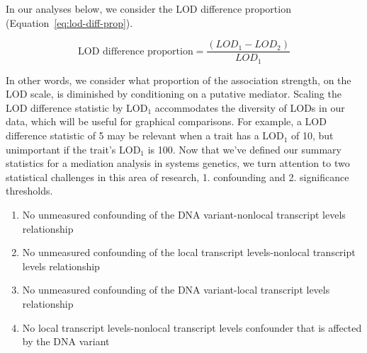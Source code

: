 \documentclass[oneside]{book}\usepackage[]{graphicx}\usepackage[]{color}
\newenvironment{frameenv}[1]
    {\begin{myfloat}[tb]
    \begin{mdframed}[roundcorner=10pt,backgroundcolor=blue!10]
    \caption{#1}
    }
    {%
    \end{mdframed}\end{myfloat}
    }
\begin{document}
In our analyses below, we consider the LOD difference 
proportion (Equation~\ref{eq:lod-diff-prop}).

\begin{equation}
\text{LOD difference proportion} = \frac{(LOD_1 - LOD_2)}{LOD_1}
\label{eq:lod-diff-prop}
\end{equation}

In other words, we consider what proportion of the association strength, on the LOD scale, is diminished by conditioning on a putative mediator. 
Scaling the LOD difference statistic by LOD$_1$ accommodates the diversity of LODs in our data, which will be useful for graphical comparisons. 
For example, a LOD difference statistic of 5 may be relevant when 
a trait has a LOD$_1$ of 10, but unimportant if the trait's LOD$_1$ is 100. Now that we've defined our summary statistics for a mediation analysis in systems genetics, we turn attention to two statistical challenges in this area of research, 1. confounding and 2. significance thresholds.












\begin{frameenv}{Four assumptions for causal inference}\label{frame1}
  \begin{enumerate}
\item No unmeasured confounding of the DNA variant-nonlocal transcript levels relationship
\item No unmeasured confounding of the local transcript levels-nonlocal transcript levels relationship
\item No unmeasured confounding of the DNA variant-local transcript levels relationship
\item No local transcript levels-nonlocal transcript levels confounder that is affected by the DNA variant
\end{enumerate}

\end{frameenv}
\end{document}
